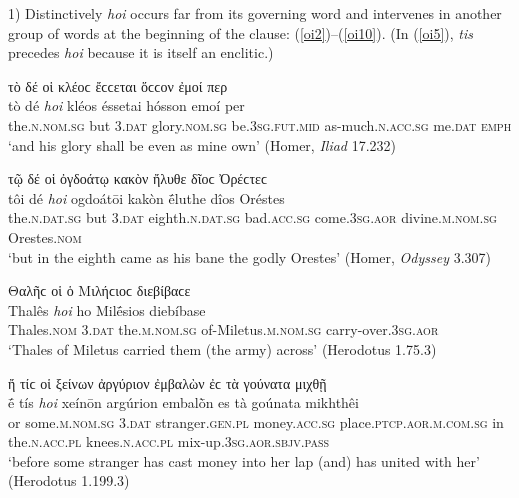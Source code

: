 1) Distinctively  \emph{hoi} occurs far from its governing word and intervenes in another group of words at the beginning of the clause: (\ref{oi2})--(\ref{oi10}). (In (\ref{oi5}), \emph{tis} precedes \emph{hoi} because it is itself an enclitic.)

\begin{exe}
\ex τὸ δέ {οἱ} κλέοϲ {ἔϲϲεται} ὅϲϲον ἐμοί περ\\
\gll tò dé \emph{hoi} kléos {éssetai} hósson emoí per\\
the.\textsc{n.nom.sg} but \textsc{3.dat} glory.\textsc{nom.sg} be.\textsc{3sg.fut.mid} as-much.\textsc{n.acc.sg} me.\textsc{dat} \textsc{emph}\\
\trans `and his glory shall be even as mine own' (Homer, \emph{Iliad} 17.232)
\label{oi2}
\end{exe}

\begin{exe}
\ex τῷ δέ {οἱ} ὀγδοάτῳ κακὸν {ἤλυθε} δῖοϲ Ὀρέϲτεϲ\\
\gll tôi dé \emph{hoi} ogdoátōi kakòn {ḗluthe} dîos Oréstes\\
the.\textsc{n.dat.sg} but \textsc{3.dat} eighth.\textsc{n.dat.sg} bad.\textsc{acc.sg} come.\textsc{3sg.aor} divine.\textsc{m.nom.sg} Orestes.\textsc{nom}\\
\trans `but in the eighth came as his bane the godly Orestes' (Homer, \emph{Odyssey} 3.307)
\label{oi3}
\end{exe}

\begin{exe}
\ex Θαλῆϲ {οἱ} ὁ Μιλήϲιοϲ {διεβίβαϲε}\\
\gll Thalês \emph{hoi} ho Milḗsios {diebíbase}\\
Thales.\textsc{nom} \textsc{3.dat} the.\textsc{m.nom.sg} of-Miletus.\textsc{m.nom.sg} carry-over.\textsc{3sg.aor}\\
\trans `Thales of Miletus carried them (the army) across' (Herodotus 1.75.3)
\label{oi4}
\end{exe}

\begin{exe}
\ex ἤ τίϲ {οἱ} ξείνων ἀργύριον ἐμβαλὼν ἐϲ τὰ γούνατα {μιχθῇ}\\
\gll ḗ tís \emph{hoi} xeínōn argúrion embalṑn es tà goúnata mikhthêi\\
or some.\textsc{m.nom.sg} \textsc{3.dat} stranger.\textsc{gen.pl} money.\textsc{acc.sg} place.\textsc{ptcp.aor.m.com.sg} in the.\textsc{n.acc.pl} knees.\textsc{n.acc.pl} mix-up.\textsc{3sg.aor.sbjv.pass}\\
\trans `before some stranger has cast money into her lap (and) has united with her' (Herodotus 1.199.3)
\label{oi5}
\end{exe}

